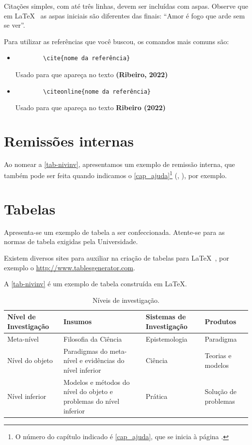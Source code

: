 Citações simples, com até três linhas, devem ser incluídas com aspas. Observe que em \LaTeX~ as aspas iniciais são diferentes das finais: ``Amor é fogo que arde sem se ver''. 

Para utilizar as referências que você buscou, os comandos mais comuns são:

\begin{itemize}
	\item \begin{verbatim}
		\cite{nome da referência} 
		\end{verbatim}
		Usado para que apareça no texto \textbf{(Ribeiro, 2022)}
	\item \begin{verbatim}
		\citeonline{nome da referência} 
		\end{verbatim}
		Usado para que apareça no texto \textbf{Ribeiro (2022)}
\end{itemize}

\section{Remissões internas}

Ao nomear a \autoref{tab-nivinv}, apresentamos um exemplo de remissão interna, que também pode ser feita quando indicamos o \autoref{cap_ajuda}\footnote{O número do capítulo indicado é \ref{cap_ajuda}, que se inicia à página \pageref{cap_ajuda}.}
(, ), por exemplo.

\section{Tabelas}

Apresenta-se um exemplo de tabela a ser confeccionada. Atente-se para as normas de tabela exigidas pela Universidade.

Existem diversos sites para auxiliar na criação de tabelas para \LaTeX~, por exemplo o \url{http://www.tablesgenerator.com}.

A \autoref{tab-nivinv} é um exemplo de tabela construída em
\LaTeX.

\begin{table}[htb]
\footnotesize
\caption[Níveis de investigação]{Níveis de investigação.}
\label{tab-nivinv}
\begin{tabular}{p{2.6cm}|p{6.0cm}|p{2.25cm}|p{3.40cm}}
   \hline
   \textbf{Nível de Investigação} & \textbf{Insumos}  & \textbf{Sistemas de Investigação}  & \textbf{Produtos}  \\
   \hline
   Meta-nível & Filosofia\index{filosofia} da Ciência  & Epistemologia & Paradigma  \\
   Nível do objeto & Paradigmas do meta-nível e evidências do nível inferior & Ciência  & Teorias e modelos \\
   Nível inferior & Modelos e métodos do nível do objeto e problemas do nível inferior & Prática & Solução de problemas  \\
   \hline
\end{tabular}
\end{table}


